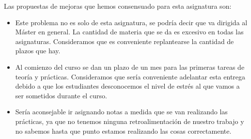 	
	Las propuestas de mejoras que hemos consensuado para esta asignatura son:
	
	\begin{itemize}
		\item  Este problema no es solo de esta asignatura, se podría decir que va dirigida al Máster en general. La cantidad de materia que se da es excesivo en todas las asignaturas. Consideramos que es conveniente replantearse la cantidad de plazos que hay.
		
		\item Al comienzo del curso se dan un plazo de un mes para las primeras tareas de teoría y prácticas. Consideramos que sería conveniente adelantar esta entrega debido a que los estudiantes desconocemos el nivel de estrés al que vamos a ser sometidos durante el curso.
		
		\item Sería aconsejable ir asignando notas a medida que se van realizando las prácticas, ya que no tenemos ninguna retroalimentación de nuestro trabajo y no sabemos hasta que punto estamos realizando las cosas correctamente.
	\end{itemize}

%
%

       
